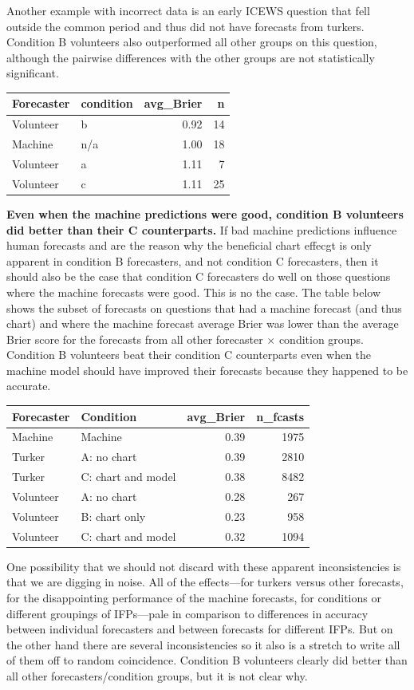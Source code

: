 \documentclass[]{article}
\begin{document}
Another example with incorrect data is an early ICEWS question that fell
outside the common period and thus did not have forecasts from turkers.
Condition B volunteers also outperformed all other groups on this
question, although the pairwise differences with the other groups are
not statistically significant.

\begin{longtable}[]{@{}llrr@{}}
\toprule
Forecaster & condition & avg\_Brier & n\tabularnewline
\midrule
\endhead
Volunteer & b & 0.92 & 14\tabularnewline
Machine & n/a & 1.00 & 18\tabularnewline
Volunteer & a & 1.11 & 7\tabularnewline
Volunteer & c & 1.11 & 25\tabularnewline
\bottomrule
\end{longtable}

\clearpage

\textbf{Even when the machine predictions were good, condition B
volunteers did better than their C counterparts.} If bad machine
predictions influence human forecasts and are the reason why the
beneficial chart effecgt is only apparent in condition B forecasters,
and not condition C forecasters, then it should also be the case that
condition C forecasters do well on those questions where the machine
forecasts were good. This is no the case. The table below shows the
subset of forecasts on questions that had a machine forecast (and thus
chart) and where the machine forecast average Brier was lower than the
average Brier score for the forecasts from all other forecaster
\(\times\) condition groups. Condition B volunteers beat their condition
C counterparts even when the machine model should have improved their
forecasts because they happened to be accurate.

\begin{longtable}[]{@{}llrr@{}}
\toprule
Forecaster & Condition & avg\_Brier & n\_fcasts\tabularnewline
\midrule
\endhead
Machine & Machine & 0.39 & 1975\tabularnewline
Turker & A: no chart & 0.39 & 2810\tabularnewline
Turker & C: chart and model & 0.38 & 8482\tabularnewline
Volunteer & A: no chart & 0.28 & 267\tabularnewline
Volunteer & B: chart only & 0.23 & 958\tabularnewline
Volunteer & C: chart and model & 0.32 & 1094\tabularnewline
\bottomrule
\end{longtable}

One possibility that we should not discard with these apparent
inconsistencies is that we are digging in noise. All of the
effects---for turkers versus other forecasts, for the disappointing
performance of the machine forecasts, for conditions or different
groupings of IFPs---pale in comparison to differences in accuracy
between individual forecasters and between forecasts for different IFPs.
But on the other hand there are several inconsistencies so it also is a
stretch to write all of them off to random coincidence. Condition B
volunteers clearly did better than all other forecasters/condition
groups, but it is not clear why.
\end{document}
